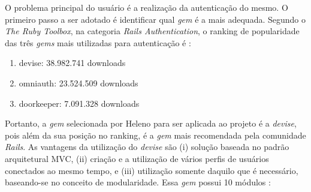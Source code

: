 O problema principal do usuário é a realização da autenticação do mesmo. O primeiro passo a ser adotado é identificar qual \textit{gem} é a mais adequada. Segundo o \textit{The Ruby Toolbox}, na categoria \textit{Rails Authentication}, o ranking de popularidade das três \textit{gems} mais utilizadas para autenticação é \cite{rubytoolbox}:

\begin{enumerate}
	\item devise: 38.982.741 downloads
	\item omniauth: 23.524.509 downloads
	\item doorkeeper: 7.091.328 downloads
\end{enumerate}

Portanto, a \textit{gem} selecionada por Heleno para ser aplicada ao projeto é a \textit{devise}, pois além da sua posição no ranking, é a \textit{gem} mais recomendada pela comunidade \textit{Rails}. As vantagens da utilização do \textit{devise} são  (i) solução baseada no padrão arquitetural MVC, (ii) criação e a utilização de vários perfis de usuários conectados ao mesmo tempo, e (iii) utilização somente daquilo que é necessário, baseando-se no conceito de modularidade. Essa \textit{gem} possui 10 módulos \cite{gemdevise}: 

